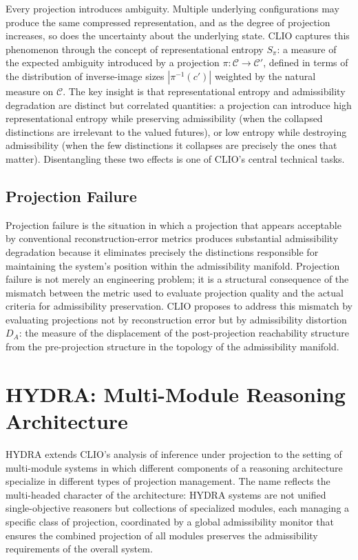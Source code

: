 \documentclass[11pt, oneside]{book}
\theoremstyle{definition}
\theoremstyle{remark}
\begin{document}
Every projection introduces ambiguity. Multiple underlying configurations may produce the same compressed representation, and as the degree of projection increases, so does the uncertainty about the underlying state. CLIO captures this phenomenon through the concept of representational entropy $S_\pi$: a measure of the expected ambiguity introduced by a projection $\pi : \mathcal{C} \to \mathcal{C}'$, defined in terms of the distribution of inverse-image sizes $|\pi^{-1}(c')|$ weighted by the natural measure on $\mathcal{C}$. The key insight is that representational entropy and admissibility degradation are distinct but correlated quantities: a projection can introduce high representational entropy while preserving admissibility (when the collapsed distinctions are irrelevant to the valued futures), or low entropy while destroying admissibility (when the few distinctions it collapses are precisely the ones that matter). Disentangling these two effects is one of CLIO's central technical tasks.

\subsection{Projection Failure}

Projection failure is the situation in which a projection that appears acceptable by conventional reconstruction-error metrics produces substantial admissibility degradation because it eliminates precisely the distinctions responsible for maintaining the system's position within the admissibility manifold. Projection failure is not merely an engineering problem; it is a structural consequence of the mismatch between the metric used to evaluate projection quality and the actual criteria for admissibility preservation. CLIO proposes to address this mismatch by evaluating projections not by reconstruction error but by admissibility distortion $D_A$: the measure of the displacement of the post-projection reachability structure from the pre-projection structure in the topology of the admissibility manifold.

\section{HYDRA: Multi-Module Reasoning Architecture}

HYDRA extends CLIO's analysis of inference under projection to the setting of multi-module systems in which different components of a reasoning architecture specialize in different types of projection management. The name reflects the multi-headed character of the architecture: HYDRA systems are not unified single-objective reasoners but collections of specialized modules, each managing a specific class of projection, coordinated by a global admissibility monitor that ensures the combined projection of all modules preserves the admissibility requirements of the overall system.
\end{document}
